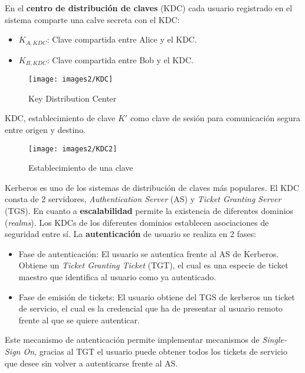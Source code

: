 \documentclass[10pt,portrait, twocolumn]{article}
\begin{document}
En el \textbf{centro de distribución de claves} (KDC) cada usuario registrado en el sistema comparte una calve secreta con el KDC:

	\begin{itemize}
		\item $K_{A, KDC}$: Clave compartida entre Alice y el KDC.
		\item $K_{B, KDC}$: Clave compartida entre Bob y el KDC.
	\end{itemize}
	
	\begin{figure}[ht!]
	\centering
	\texttt{[image: images2/KDC]}
	\caption{Key Distribution Center}
	\label{figure:Planta1}
	\end{figure}
	
KDC, establecimiento de clave $K'$ como clave de sesión para comunicación segura entre origen y destino.
	
	\begin{figure}[ht!]
	\centering
	\texttt{[image: images2/KDC2]}
	\caption{Establecimiento de una clave}
	\label{figure:Planta1}
	\end{figure}
	
Kerberos es uno de los sistemas de distribución de claves más populares. El KDC consta de 2 servidores, \textit{Authentication Server} (AS) y \textit{Ticket Granting Server} (TGS). En cuanto a \textbf{escalabilidad} permite la existencia de diferentes dominios (\textit{realms}). Los KDCs de los diferentes dominios establecen asociaciones de seguridad entre sí. La \textbf{autenticación} de usuario se realiza en 2 fases:

	\begin{itemize}
		\item Fase de autenticación: El usuario se autentica frente al AS de Kerberos. Obtiene un \textit{Ticket Granting Ticket} (TGT), el cual es una especie de ticket maestro que identifica al usuario como ya autenticado. 
		\item Fase de emisión de tickets: El usuario obtiene del TGS de kerberos un ticket de servicio, el cual es la credencial que ha de presentar al usuario remoto frente al que se quiere autenticar.
	\end{itemize}
	
Este mecanismo de autenticación permite implementar mecanismos de \textit{Single-Sign On}, gracias al TGT el usuario puede obtener todos los tickets de servicio que desee sin volver a autenticarse frente al AS.
\end{document}
